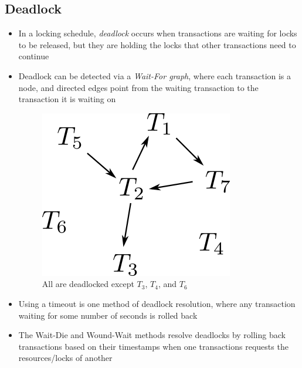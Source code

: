 \documentclass[a4paper]{article}
\begin{document}
\subsection{Deadlock}
\begin{itemize}
\item In a locking schedule, \emph{deadlock} occurs when transactions are waiting for locks to be released, but they are holding the locks that other transactions need to continue
\item Deadlock can be detected via a \emph{Wait-For graph}, where each transaction is a node, and directed edges point from the waiting transaction to the transaction it is waiting on
\begin{figure}[H]
\centering
\includegraphics[width=0.3\linewidth]{waits_for.png}
\caption*{All are deadlocked except $T_3$, $T_4$, and $T_6$}
\end{figure}
\item Using a timeout is one method of deadlock resolution, where any transaction waiting for some number of seconds is rolled back
\item The Wait-Die and Wound-Wait methods resolve deadlocks by rolling back transactions based on their timestamps when one transactions requests the resources/locks of another
\end{itemize}
\end{document}
